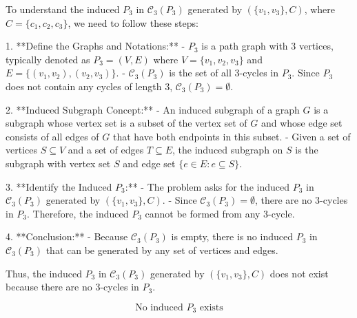 To understand the induced \( P_3 \) in \( \mathcal{C}_3(P_3) \) generated by \( (\{v_1, v_3\}, C) \), where \( C = \{c_1, c_2, c_3\} \), we need to follow these steps:

1. **Define the Graphs and Notations:**
   - \( P_3 \) is a path graph with 3 vertices, typically denoted as \( P_3 = (V, E) \) where \( V = \{v_1, v_2, v_3\} \) and \( E = \{(v_1, v_2), (v_2, v_3)\} \).
   - \( \mathcal{C}_3(P_3) \) is the set of all 3-cycles in \( P_3 \). Since \( P_3 \) does not contain any cycles of length 3, \( \mathcal{C}_3(P_3) = \emptyset \).

2. **Induced Subgraph Concept:**
   - An induced subgraph of a graph \( G \) is a subgraph whose vertex set is a subset of the vertex set of \( G \) and whose edge set consists of all edges of \( G \) that have both endpoints in this subset.
   - Given a set of vertices \( S \subseteq V \) and a set of edges \( T \subseteq E \), the induced subgraph on \( S \) is the subgraph with vertex set \( S \) and edge set \( \{e \in E : e \subseteq S\} \).

3. **Identify the Induced \( P_3 \):**
   - The problem asks for the induced \( P_3 \) in \( \mathcal{C}_3(P_3) \) generated by \( (\{v_1, v_3\}, C) \).
   - Since \( \mathcal{C}_3(P_3) = \emptyset \), there are no 3-cycles in \( P_3 \). Therefore, the induced \( P_3 \) cannot be formed from any 3-cycle.

4. **Conclusion:**
   - Because \( \mathcal{C}_3(P_3) \) is empty, there is no induced \( P_3 \) in \( \mathcal{C}_3(P_3) \) that can be generated by any set of vertices and edges.

Thus, the induced \( P_3 \) in \( \mathcal{C}_3(P_3) \) generated by \( (\{v_1, v_3\}, C) \) does not exist because there are no 3-cycles in \( P_3 \).

\[
\boxed{\text{No induced } P_3 \text{ exists}}
\]